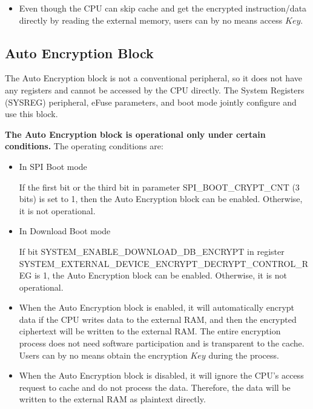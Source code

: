\documentclass[main\_\_EN.tex]{subfiles}
\begin{document}
\begin{tiplisting}
\vspace{-2em}
\begin{itemize}
\item Even though the CPU can skip cache and get the encrypted instruction/data directly by reading the external memory, users can by no means access \begin{math}Key\end{math}.
\end{itemize}
\end{tiplisting}

\subsection{Auto Encryption Block}

The Auto Encryption block is not a conventional peripheral, so it does not have any registers and cannot be accessed by the CPU directly. The System Registers (SYSREG) peripheral, eFuse parameters, and boot mode jointly configure and use this block.

\textbf{The Auto Encryption block is operational only under certain conditions.} The operating conditions are:

\begin{itemize}

    \item In SPI Boot mode

    If the first bit or the third bit in parameter SPI\_BOOT\_CRYPT\_CNT (3 bits) is set to 1, then the Auto Encryption block can be enabled. Otherwise, it is not operational.

    \item In Download Boot mode

    If bit SYSTEM\_ENABLE\_DOWNLOAD\_DB\_ENCRYPT in register SYSTEM\_EXTERNAL\_DEVICE\_ENCRYPT\_DECRYPT\_CONTROL\_REG is 1, the Auto Encryption block can be enabled. Otherwise, it is not operational.

\end{itemize}


\begin{tiplisting}
\vspace{-2em}
\begin{itemize}

\item When the Auto Encryption block is enabled, it will automatically encrypt data if the CPU writes data to the external RAM, and then the encrypted ciphertext will be written to the external RAM. The entire encryption process does not need software participation and is transparent to the cache. Users can by no means obtain the encryption \begin{math}Key\end{math} during the process.

\item When the Auto Encryption block is disabled, it will ignore the CPU's access request to cache and do not process the data. Therefore, the data will be written to the external RAM as plaintext directly.

\end{itemize}
\end{tiplisting}
\end{document}
